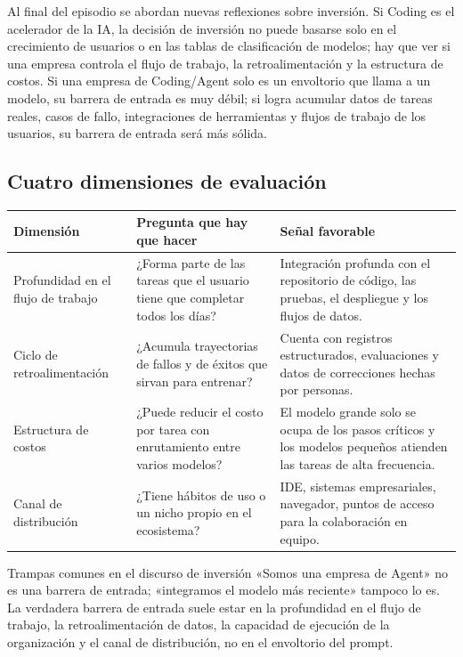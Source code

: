 \documentclass[a4paper]{article}
\begin{document}
Al final del episodio se abordan nuevas reflexiones sobre inversión. Si Coding es el acelerador de la IA, la decisión de inversión no puede basarse solo en el crecimiento de usuarios o en las tablas de clasificación de modelos; hay que ver si una empresa controla el flujo de trabajo, la retroalimentación y la estructura de costos. Si una empresa de Coding/Agent solo es un envoltorio que llama a un modelo, su barrera de entrada es muy débil; si logra acumular datos de tareas reales, casos de fallo, integraciones de herramientas y flujos de trabajo de los usuarios, su barrera de entrada será más sólida.

\subsection{Cuatro dimensiones de evaluación}

\noindent\begin{tabularx}{\textwidth}{p{}p{}X}
\toprule
Dimensión & Pregunta que hay que hacer & Señal favorable \\
\midrule
Profundidad en el flujo de trabajo & ¿Forma parte de las tareas que el usuario tiene que completar todos los días? & Integración profunda con el repositorio de código, las pruebas, el despliegue y los flujos de datos. \\
Ciclo de retroalimentación & ¿Acumula trayectorias de fallos y de éxitos que sirvan para entrenar? & Cuenta con registros estructurados, evaluaciones y datos de correcciones hechas por personas. \\
Estructura de costos & ¿Puede reducir el costo por tarea con enrutamiento entre varios modelos? & El modelo grande solo se ocupa de los pasos críticos y los modelos pequeños atienden las tareas de alta frecuencia. \\
Canal de distribución & ¿Tiene hábitos de uso o un nicho propio en el ecosistema? & IDE, sistemas empresariales, navegador, puntos de acceso para la colaboración en equipo. \\
\bottomrule
\end{tabularx}

\begin{warningbox}{Trampas comunes en el discurso de inversión}
«Somos una empresa de Agent» no es una barrera de entrada; «integramos el modelo más reciente» tampoco lo es. La verdadera barrera de entrada suele estar en la profundidad en el flujo de trabajo, la retroalimentación de datos, la capacidad de ejecución de la organización y el canal de distribución, no en el envoltorio del prompt.
\end{warningbox}
\end{document}
